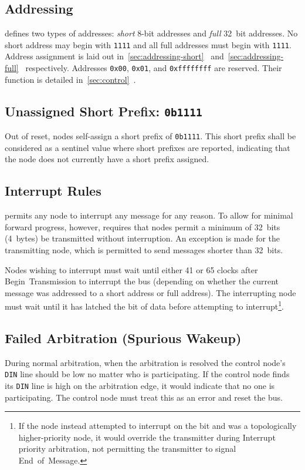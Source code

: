 \subsection{Addressing}
\label{sec:spec-address}
\bus defines two types of addresses: \textit{short} 8-bit addresses and
\textit{full} 32~bit addresses. No short address may begin with {\tt 1111} and
all full addresses must begin with {\tt 1111}. Address assignment is laid out
in~\ref{sec:addressing-short}~
and~\ref{sec:addressing-full}~ respectively.
%
Addresses {\tt 0x00}, {\tt 0x01}, and {\tt 0xffffffff} are reserved. Their
function is detailed in~\ref{sec:control}~.

\subsection{Unassigned Short Prefix: \texttt{0b1111}}
\label{sec:spec-unassigned-short-prefix}
Out of reset, nodes self-assign a short prefix of {\tt 0b1111}. This short
prefix shall be considered as a sentinel value where short prefixes are
reported, indicating that the node does not currently have a short prefix
assigned.

\subsection{Interrupt Rules}
\label{sec:spec-interrupt}
\bus permits any node to interrupt any message for any reason. To allow for
minimal forward progress, however, \bus requires that nodes permit a minimum
of 32~bits (4~bytes) be transmitted without interruption. An exception is made
for the transmitting node, which is permitted to send messages shorter than
32~bits.

Nodes wishing to interrupt must wait until either 41 or 65 clocks after
Begin~Transmission to interrupt the bus (depending on whether the current
message was addressed to a short address or full address). The interrupting
node must wait until it has latched the  bit of data before attempting
to interrupt\footnote{
  If the node instead attempted to interrupt on the  bit and was a
  topologically higher-priority node, it would override the transmitter during
  Interrupt priority arbitration, not permitting the transmitter to signal
  End~of~Message.}.

\subsection{Failed Arbitration (Spurious Wakeup)}
\label{sec:spec-spurious}
During normal arbitration, when the arbitration is resolved the control node's
{\tt DIN} line should be low no matter who is participating. If the control
node finds its {\tt DIN} line is high on the arbitration edge, it would
indicate that no one is participating. The control node must treat this as an
error and reset the bus.

